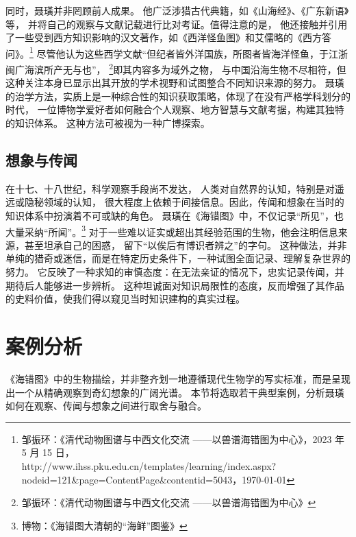 \documentclass{source/Paper}
\begin{document}
同时，聂璜并非罔顾前人成果。
他广泛涉猎古代典籍，如《山海经》、《广东新语》等，
并将自己的观察与文献记载进行比对考证。值得注意的是，
他还接触并引用了一些受到西方知识影响的汉文著作，如《西洋怪鱼图》和艾儒略的《西方答问》。\footnote{邹振环：《清代动物图谱与中西文化交流 ——以\textlangle 兽谱\textrangle \textlangle 海错图\textrangle 为中心》，2023 年 5 月 15 日，\\http://www.ihss.pku.edu.cn/templates/learning/index.aspx?nodeid=121\&page=ContentPage\&contentid=5043，\today}
尽管他认为这些西学文献“但纪者皆外洋国族，所图者皆海洋怪鱼，于江浙闽广海滨所产无与也”，
\footnote{邹振环：《清代动物图谱与中西文化交流 ——以\textlangle 兽谱\textrangle \textlangle 海错图\textrangle 为中心》}即其内容多为域外之物，
与中国沿海生物不尽相符，但这种关注本身已显示出其开放的学术视野和试图整合不同知识来源的努力。
聂璜的治学方法，实质上是一种综合性的知识获取策略，体现了在没有严格学科划分的时代，
一位博物学爱好者如何融合个人观察、地方智慧与文献考据，构建其独特的知识体系。
这种方法可被视为一种广博探索。

\subsection{想象与传闻}
在十七、十八世纪，科学观察手段尚不发达，
人类对自然界的认知，特别是对遥远或隐秘领域的认知，
很大程度上依赖于间接信息。因此，传闻和想象在当时的知识体系中扮演着不可或缺的角色。
聂璜在《海错图》中，不仅记录“所见”，也大量采纳“所闻”。\footnote{博物：《\textlangle 海错图\textrangle 大清朝的“海鲜”图鉴》}
对于一些难以证实或超出其经验范围的生物，他会注明信息来源，甚至坦承自己的困惑，
留下“以俟后有博识者辨之”的字句。
这种做法，并非单纯的猎奇或迷信，而是在特定历史条件下，一种试图全面记录、理解复杂世界的努力。
它反映了一种求知的审慎态度：在无法亲证的情况下，忠实记录传闻，并期待后人能够进一步辨析。
这种坦诚面对知识局限性的态度，反而增强了其作品的史料价值，使我们得以窥见当时知识建构的真实过程。

\section{案例分析}
《海错图》中的生物描绘，并非整齐划一地遵循现代生物学的写实标准，而是呈现出一个从精确观察到奇幻想象的广阔光谱。
本节将选取若干典型案例，分析聂璜如何在观察、传闻与想象之间进行取舍与融合。
\end{document}
